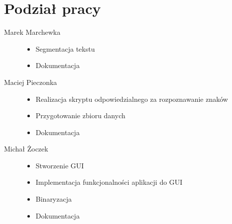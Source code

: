 \section{Podział pracy}
\begin{description}
  \item[Marek Marchewka] \hfill
    \begin{itemize}
        \item Segmentacja tekstu
        \item Dokumentacja
    \end{itemize}
  \item[Maciej Pieczonka] \hfill
    \begin{itemize}
        \item Realizacja skryptu odpowiedzialnego za rozpoznawanie znaków
        \item Przygotowanie zbioru danych
        \item Dokumentacja
    \end{itemize}
  \item[Michał Żoczek] \hfill
    \begin{itemize}
        \item Stworzenie GUI
        \item Implementacja funkcjonalności aplikacji do GUI
        \item Binaryzacja
        \item Dokumentacja
    \end{itemize}
\end{description}